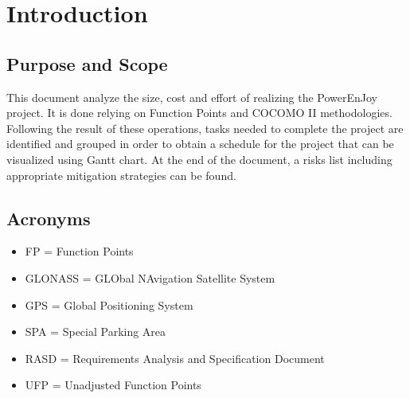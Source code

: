 \section{Introduction}

\subsection{Purpose and Scope}
This document analyze the size, cost and effort of realizing the PowerEnJoy project. It is done relying on Function Points and COCOMO II methodologies. Following the result of these operations, tasks needed to complete the project are identified and grouped in order to obtain a schedule for the project that can be visualized using Gantt chart. At the end of the document, a risks list including appropriate mitigation strategies can be found.


\subsection{Acronyms}
\begin{itemize}
    \item FP = Function Points
    \item GLONASS = GLObal NAvigation Satellite System
    \item GPS = Global Positioning System
    \item SPA = Special Parking Area
    \item RASD = Requirements Analysis and Specification Document
    \item UFP = Unadjusted Function Points
\end{itemize}

